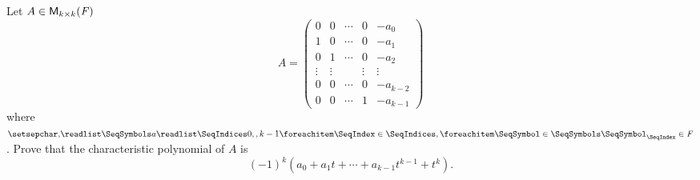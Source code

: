 \begin{ex}\label{ex:5.4.19}
  Let \(A \in \mathsf{M}_{{k} \times k}({\mathit{F}})\)
  \[
    A = \begin{pmatrix}
      0      & 0      & \cdots & 0      & -a_0       \\
      1      & 0      & \cdots & 0      & -a_1       \\
      0      & 1      & \cdots & 0      & -a_2       \\
      \vdots & \vdots &        & \vdots & \vdots     \\
      0      & 0      & \cdots & 0      & -a_{k - 2} \\
      0      & 0      & \cdots & 1      & -a_{k - 1}
    \end{pmatrix}
  \]
  where \(\seq{a}{0,,k-1} \in \F\).
  Prove that the characteristic polynomial of \(A\) is
  \[
    (-1)^k (a_0 + a_1 t + \cdots + a_{k - 1} t^{k - 1} + t^k).
  \]
\end{ex}

